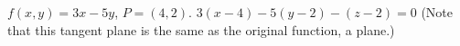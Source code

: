 {$f(x,y) = 3x-5y$,   $P=(4,2)$.
}
{
$3(x-4)-5(y-2) - (z-2) = 0$ (Note that this tangent plane is the same as the original function, a plane.)
}